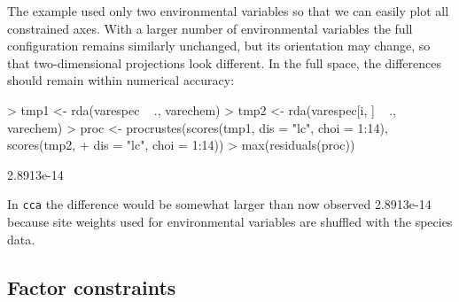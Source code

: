 \documentclass[a4paper,10pt]{amsart}
\begin{document}
The example used only two environmental variables so that we can
easily plot all constrained axes.  With a larger number of
environmental variables the full configuration remains similarly
unchanged, but its orientation may change, so that two-dimensional
projections look different.  In the full space, the differences should
remain within numerical accuracy:
\begin{Schunk}
\begin{Sinput}
> tmp1 <- rda(varespec ~ ., varechem)
> tmp2 <- rda(varespec[i, ] ~ ., varechem)
> proc <- procrustes(scores(tmp1, dis = "lc", choi = 1:14), scores(tmp2, 
+     dis = "lc", choi = 1:14))
> max(residuals(proc))
\end{Sinput}
\begin{Soutput}
[1] 2.8913e-14
\end{Soutput}
\end{Schunk}
In \texttt{cca} the difference would be somewhat larger than now
observed 2.8913e-14 because site
weights used for environmental variables are shuffled with the species
data.

\subsection{Factor constraints}
\end{document}
